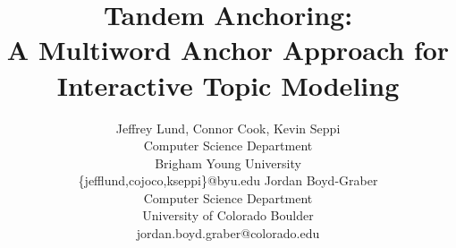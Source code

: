 \documentclass[11pt]{article}
\title{Tandem Anchoring: \\ A Multiword Anchor Approach for Interactive Topic Modeling}
\author{Jeffrey Lund, Connor Cook, Kevin Seppi \\
        Computer Science Department \\
        Brigham Young University \\
        \{jefflund,cojoco,kseppi\}@byu.edu
        \And
        Jordan Boyd-Graber \\
        Computer Science Department \\
        University of Colorado Boulder \\
        jordan.boyd.graber@colorado.edu}
\date{}
\begin{document}
\maketitle

\begin{abstract}

\end{abstract}







\newpage



\newpage

\small


\end{document}
